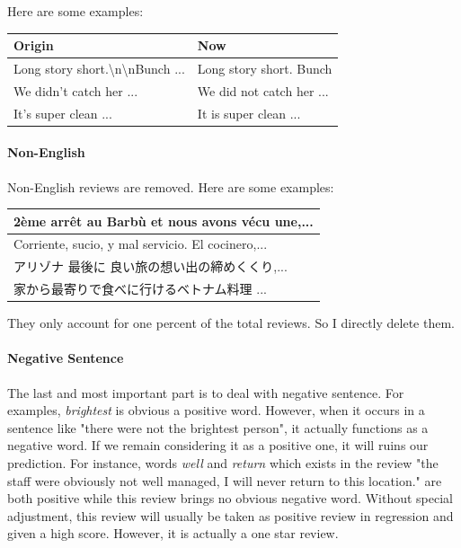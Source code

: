 \documentclass[UTF8]{article}
\begin{document}
\newpage

Here are some examples:

\begin{table}[!htb]
    \begin{tabular}{|l|l|}
    \hline
    Origin                                                       & Now                      \\ \hline
    Long story short.\textbackslash{}n\textbackslash{}nBunch ... & Long story short. Bunch  \\ \hline
    We didn’t catch her ...                                      & We did not catch her ... \\ \hline
    It’s super clean ...                                         & It is super clean ...    \\ \hline
    \end{tabular}
\end{table}



\paragraph{Non-English} 

Non-English reviews are removed. Here are some examples:

\begin{table}[!htb]
    \begin{tabular}{|l|}
    \hline
    2ème arrêt au Barbù et nous avons vécu une,...    \\ \hline
    Corriente, sucio, y mal servicio. El cocinero,... \\ \hline
    アリゾナ 最後に 良い旅の想い出の締めくくり,...                        \\ \hline
    家から最寄りで食べに行けるベトナム料理 ...                           \\ \hline
    \end{tabular}
\end{table}

They only account for one percent of the total reviews. So I directly delete them.

\paragraph{Negative Sentence} 

The last and most important part is to deal with negative sentence. For examples, \textit{brightest} is obvious a positive word. However, when it occurs in a sentence like "there were not the brightest person", it actually functions as a negative word. If we remain considering it as a positive one, it will ruins our prediction. For instance, words \textit{well} and \textit{return} which exists in the  review "the staff were obviously not well managed, I will never return to this location." are both positive while this review brings no obvious negative word. Without special adjustment, this review will usually be taken as positive review in regression and given a high score. However, it is actually a one star review.
\end{document}
